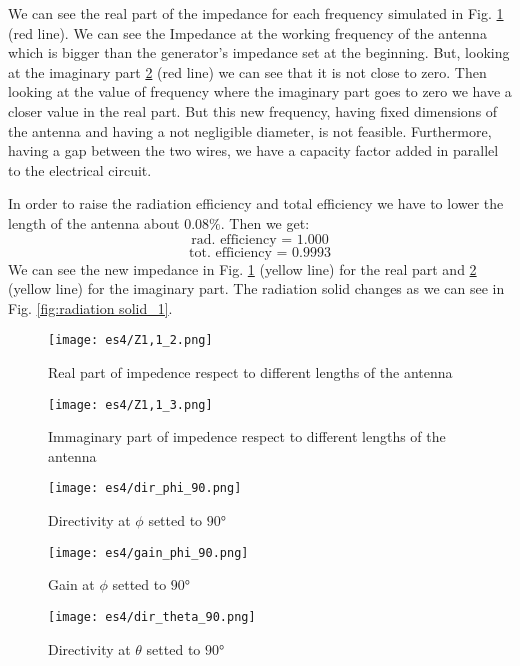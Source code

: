 \documentclass{article}
\begin{document}
We can see the real part of the impedance for each frequency simulated in Fig. \ref{fig:real_impedence} (red line). We can see the Impedance at the working frequency of the antenna which is bigger than the generator's impedance set at the beginning. But, looking at the imaginary part \ref{fig:immaginary_impedence} (red line) we can see that it is not close to zero. Then looking at the value of frequency where the imaginary part goes to zero we have a closer value in the real part. But this new frequency, having fixed dimensions of the antenna and having a not negligible diameter, is not feasible. Furthermore, having a gap between the two wires, we have a capacity factor added in parallel to the electrical circuit. 

In order to raise the radiation efficiency and total efficiency we have to lower the length of the antenna about $0.08\%$. Then we get:
$$\text{rad. efficiency = }1.000$$
$$\text{tot. efficiency = }0.9993$$
We can see the new impedance in Fig. \ref{fig:real_impedence} (yellow line) for the real part and \ref{fig:immaginary_impedence} (yellow line) for the imaginary part. The radiation solid changes as we can see in Fig. \ref{fig:radiation solid_1}.





\begin{figure}[h]
\centering
\texttt{[image: es4/Z1,1\_2.png]}
\caption{Real part of impedence respect to different lengths of the antenna}
\label{fig:real_impedence}
\end{figure}

\begin{figure}[h]
\centering
\texttt{[image: es4/Z1,1\_3.png]}
\caption{Immaginary part of impedence respect to different lengths of the antenna}
\label{fig:immaginary_impedence}
\end{figure}

\begin{figure}[h]
\centering
\texttt{[image: es4/dir\_phi\_90.png]}
\caption{Directivity at $\phi$ setted to $90°$}
\label{fig:dir_phi_90}
\end{figure}

\begin{figure}[h]
\centering
\texttt{[image: es4/gain\_phi\_90.png]}
\caption{Gain at $\phi$ setted to $90°$}
\label{fig:gain_phi_90}
\end{figure}

\begin{figure}[h]
\centering
\texttt{[image: es4/dir\_theta\_90.png]}
\caption{Directivity at $\theta$ setted to $90°$}
\label{fig:dir_theta_90}
\end{figure}
\end{document}
